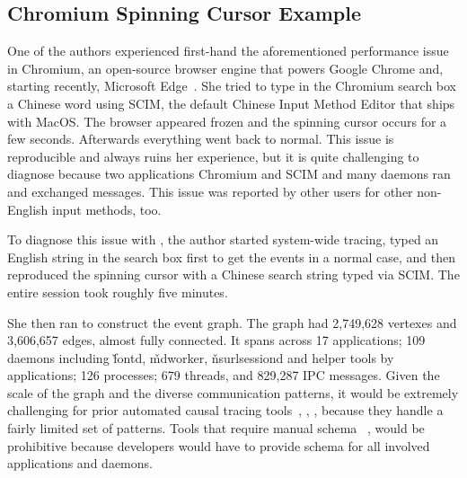 \subsection{Chromium Spinning Cursor Example}


One of the authors experienced first-hand the aforementioned performance
issue in Chromium, an open-source browser engine that powers Google Chrome
and, starting recently, Microsoft Edge~\cite{chromiumurl}.  She tried to type in
the Chromium search box a Chinese word using SCIM, the default Chinese
Input Method Editor that ships with MacOS.  The browser appeared frozen
and the spinning cursor occurs for a few seconds.  Afterwards everything
went back to normal.  This issue is reproducible and always ruins her
experience, but it is quite challenging to diagnose because two
applications Chromium and SCIM and many daemons ran and exchanged
messages.  This issue was reported by other users for other non-English
input methods, too.

To diagnose this issue with \xxx, the author started system-wide tracing,
typed an English string in the search box first to get the events in a
normal case, and then reproduced the spinning cursor with a Chinese search
string typed via SCIM.  The entire session took roughly five minutes.

She then ran \xxx to construct the event graph.  The graph had 2,749,628
vertexes and 3,606,657 edges, almost fully connected.  It spans across 17
applications; 109 daemons including \v{fontd}, \v{mdworker}, \v{nsurlsessiond}
and helper tools by applications; 126 processes; 679 threads, and 829,287 IPC
messages.  Given the scale of the graph and the diverse communication patterns,
it would be extremely challenging for prior automated causal tracing
tools~\cite{aguilera2003performance}, \cite{zhang2013panappticon},
\cite{attariyan2012x}, \cite{cohen2004correlating} because they handle a fairly
limited set of patterns.  Tools that require manual
schema~\cite{barham2004using} \cite{reynolds2006pip}, would be prohibitive
because developers would have to provide schema for all involved applications
and daemons.

